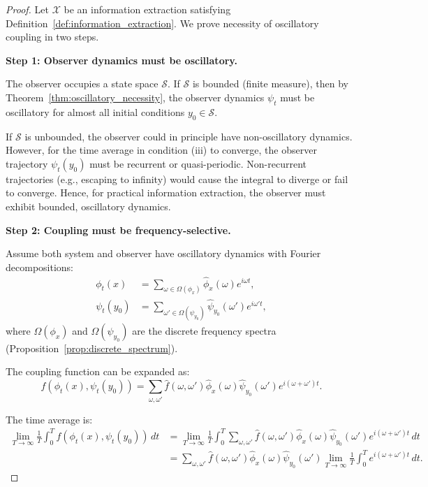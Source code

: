 \documentclass[twocolumn,10pt,a4paper]{article}
\theoremstyle{remark}
\begin{document}
\begin{proof}
Let $\mathcal{X}$ be an information extraction satisfying Definition~\ref{def:information_extraction}. We prove necessity of oscillatory coupling in two steps.

\textbf{Step 1: Observer dynamics must be oscillatory.}

The observer occupies a state space $\mathcal{S}$. If $\mathcal{S}$ is bounded (finite measure), then by Theorem~\ref{thm:oscillatory_necessity}, the observer dynamics $\psi_t$ must be oscillatory for almost all initial conditions $y_0 \in \mathcal{S}$. 

If $\mathcal{S}$ is unbounded, the observer could in principle have non-oscillatory dynamics. However, for the time average in condition (iii) to converge, the observer trajectory $\psi_t(y_0)$ must be recurrent or quasi-periodic. Non-recurrent trajectories (e.g., escaping to infinity) would cause the integral to diverge or fail to converge. Hence, for practical information extraction, the observer must exhibit bounded, oscillatory dynamics.

\textbf{Step 2: Coupling must be frequency-selective.}

Assume both system and observer have oscillatory dynamics with Fourier decompositions:
\begin{align}
\phi_t(x) &= \sum_{\omega \in \Omega(\phi_x)} \hat{\phi}_x(\omega) e^{i\omega t}, \\
\psi_t(y_0) &= \sum_{\omega' \in \Omega(\psi_{y_0})} \hat{\psi}_{y_0}(\omega') e^{i\omega' t},
\end{align}
where $\Omega(\phi_x)$ and $\Omega(\psi_{y_0})$ are the discrete frequency spectra (Proposition~\ref{prop:discrete_spectrum}).

The coupling function can be expanded as:
\begin{equation}
f(\phi_t(x), \psi_t(y_0)) = \sum_{\omega, \omega'} \hat{f}(\omega, \omega') \hat{\phi}_x(\omega) \hat{\psi}_{y_0}(\omega') e^{i(\omega + \omega')t}.
\end{equation}

The time average is:
\begin{align}
\lim_{T \to \infty} \frac{1}{T} \int_0^T f(\phi_t(x), \psi_t(y_0)) \, dt &= \lim_{T \to \infty} \frac{1}{T} \int_0^T \sum_{\omega, \omega'} \hat{f}(\omega, \omega') \hat{\phi}_x(\omega) \hat{\psi}_{y_0}(\omega') e^{i(\omega + \omega')t} \, dt \\
&= \sum_{\omega, \omega'} \hat{f}(\omega, \omega') \hat{\phi}_x(\omega) \hat{\psi}_{y_0}(\omega') \lim_{T \to \infty} \frac{1}{T} \int_0^T e^{i(\omega + \omega')t} \, dt.
\end{align}


\end{proof}
\end{document}
